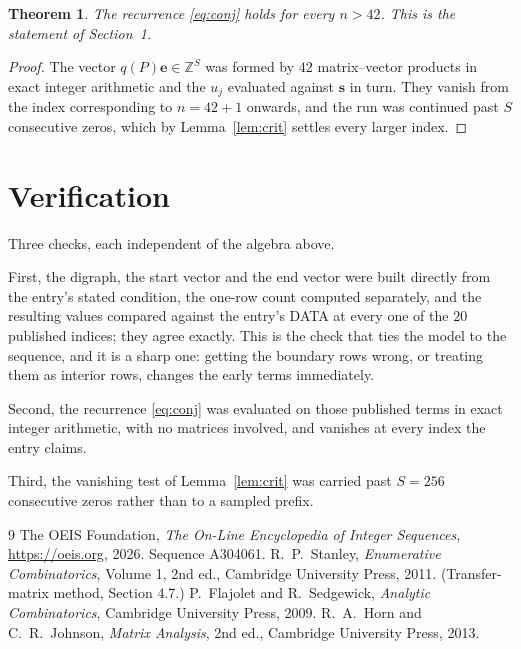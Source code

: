 \documentclass[11pt,a4paper]{article}
\theoremstyle{plain}
\newtheorem{theorem}{Theorem}
\theoremstyle{definition}
\begin{document}
\begin{theorem}
The recurrence \eqref{eq:conj} holds for every $n>42$. This is the statement of
Section~1.
\end{theorem}

\begin{proof}
The vector $q(P)\mathbf{e}\in\mathbb{Z}^{S}$ was formed by $42$ matrix--vector
products in exact integer arithmetic and the $u_j$ evaluated against $\mathbf{s}$ in turn.
They vanish from the index corresponding to $n=42+1$ onwards, and the run was continued
past $S$ consecutive zeros, which by Lemma~\ref{lem:crit} settles every larger index.
\end{proof}

\section{Verification}

Three checks, each independent of the algebra above.

First, the digraph, the start vector and the end vector were built directly from the
entry's stated condition, the one-row count computed separately, and the resulting values
compared against the entry's DATA at every one of the $20$ published indices; they
agree exactly. This is the check that ties the model to the sequence, and it is a sharp one:
getting the boundary rows wrong, or treating them as interior rows, changes the early terms
immediately.

Second, the recurrence \eqref{eq:conj} was evaluated on those published terms in exact
integer arithmetic, with no matrices involved, and vanishes at every index the entry claims.

Third, the vanishing test of Lemma~\ref{lem:crit} was carried past $S=256$ consecutive
zeros rather than to a sampled prefix.

\begin{thebibliography}{9}
 The OEIS Foundation, \emph{The On-Line Encyclopedia of Integer
Sequences}, \url{https://oeis.org}, 2026. Sequence A304061.
 R.~P.~Stanley, \emph{Enumerative Combinatorics}, Volume 1, 2nd ed.,
Cambridge University Press, 2011. (Transfer-matrix method, Section 4.7.)
 P.~Flajolet and R.~Sedgewick, \emph{Analytic Combinatorics}, Cambridge
University Press, 2009.
 R.~A.~Horn and C.~R.~Johnson, \emph{Matrix Analysis}, 2nd ed., Cambridge
University Press, 2013.
\end{thebibliography}
\end{document}
